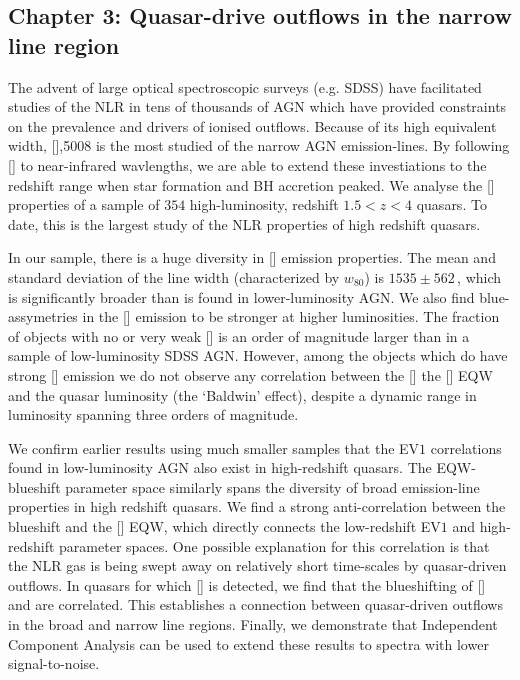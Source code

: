 \subsection{Chapter 3: Quasar-drive outflows in the narrow line region}

The advent of large optical spectroscopic surveys (e.g. SDSS) have facilitated studies of the NLR in tens of thousands of AGN which have provided constraints on the prevalence and drivers of ionised outflows.  
Because of its high equivalent width, [],5008 is the most studied of the narrow AGN emission-lines.  
By following [] to near-infrared wavlengths, we are able to extend these investiations to the redshift range when star formation and BH accretion peaked. 
We analyse the [] properties of a sample of $354$ high-luminosity, redshift $1.5 < z < 4$ quasars. 
To date, this is the largest study of the NLR properties of high redshift quasars. 

In our sample, there is a huge diversity in [] emission properties.
The mean and standard deviation of the line width (characterized by $w_{80}$) is $1535\pm562$\,\kms, which is significantly broader than is found in lower-luminosity AGN. 
We also find blue-assymetries in the [] emission to be stronger at higher luminosities. 
The fraction of objects with no or very weak [] is an order of magnitude larger than in a sample of low-luminosity SDSS AGN.
However, among the objects which do have strong [] emission we do not observe any correlation between the [] the [] EQW and the quasar luminosity (the `Baldwin' effect), despite a dynamic range in luminosity spanning three orders of magnitude. 

We confirm earlier results using much smaller samples that the EV$1$ correlations found in low-luminosity AGN also exist in high-redshift quasars. 
The  EQW-blueshift parameter space similarly spans the diversity of broad emission-line properties in high redshift quasars. 
We find a strong anti-correlation between the  blueshift and the [] EQW, which directly connects the low-redshift EV$1$ and high-redshift  parameter spaces.  
One possible explanation for this correlation is that the NLR gas is being swept away on relatively short time-scales by quasar-driven outflows. 
In quasars for which [] is detected, we find that the blueshifting of [] and  are correlated. 
This establishes a connection between quasar-driven outflows in the broad and narrow line regions.  
Finally, we demonstrate that Independent Component Analysis can be used to extend these results to spectra with lower signal-to-noise. 

